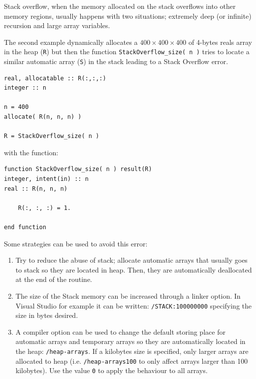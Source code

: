 Stack overflow, when the memory allocated on the stack overflows into other memory regions, usually happens with two situations; extremely deep (or infinite) recursion and large array variables. 



The second example dynamically allocates a $400\times 400\times 400$ of 4-bytes reals array in the heap (\texttt{R})  but then the function \texttt{StackOverflow\_size( n )} tries to locate a similar automatic array (\texttt{S}) in the stack leading to a Stack Overflow error. 

\begin{verbatim}
real, allocatable :: R(:,:,:)
integer :: n

n = 400
allocate( R(n, n, n) )

R = StackOverflow_size( n ) 
\end{verbatim}

with the function:

\begin{verbatim}
function StackOverflow_size( n ) result(R)
integer, intent(in) :: n
real :: R(n, n, n)    

    R(:, :, :) = 1.

end function
\end{verbatim}

Some strategies can be used to avoid this error:

\begin{enumerate}
    \item Try to reduce the abuse of stack; allocate automatic arrays that usually goes to stack so they are located in heap. Then, they are automatically deallocated at the end of the routine. 
    
    \item The size of the Stack memory can be increased through a linker option. In Visual Studio for example it can be written: \texttt{/STACK:100000000} specifying the size in bytes desired.
    
    \item A compiler option can be used to change the default storing place for automatic arrays and temporary arrays so they are automatically located in the heap: \texttt{/heap-arrays}. If a kilobytes size is specified, only larger arrays are allocated to heap (i.e. \texttt{/heap-arrays100} to only affect arrays larger than 100 kilobytes). Use the value \texttt{0} to apply the behaviour to all arrays.  
    
\end{enumerate}


